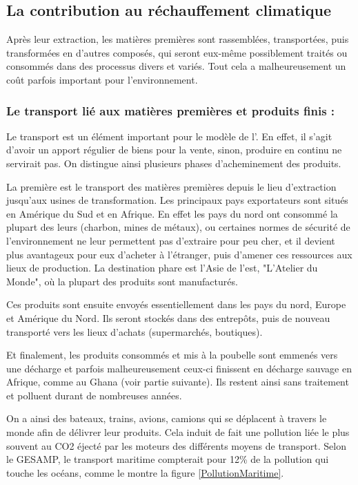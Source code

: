 \subsection{La contribution au réchauffement climatique}


Après leur extraction, les matières premières sont rassemblées, transportées, puis transformées en d'autres composés, qui seront eux-même possiblement traités ou consommés dans des processus divers et variés. Tout cela a malheureusement un coût parfois important pour l'environnement.


\subsubsection{Le transport lié aux matières premières et produits finis : }
Le transport est un élément important pour le modèle de l'\op. En effet, il s'agit d'avoir un apport régulier de biens pour la vente, sinon, produire en continu ne servirait pas. On distingue ainsi plusieurs phases d'acheminement des produits.

La première est le transport des matières premières depuis le lieu d'extraction jusqu'aux usines de transformation. Les principaux pays exportateurs sont situés en Amérique du Sud et en Afrique. En effet les pays du nord ont consommé la plupart des leurs (charbon, mines de métaux), ou certaines normes de sécurité de l'environnement ne leur permettent pas d'extraire pour peu cher, et il devient plus avantageux pour eux d'acheter à l'étranger, puis d'amener ces ressources aux lieux de production. La destination phare est l'Asie de l'est, "L'Atelier du Monde", où la plupart des produits sont manufacturés.

Ces produits sont ensuite envoyés essentiellement dans les pays du nord, Europe et Amérique du Nord. Ils seront stockés dans des entrepôts, puis de nouveau transporté vers les lieux d'achats (supermarchés, boutiques). 

Et finalement, les produits consommés et mis à la poubelle sont emmenés vers une décharge et parfois malheureusement ceux-ci finissent en décharge sauvage en Afrique, comme au Ghana (voir partie suivante). Ils restent ainsi sans traitement et polluent durant de nombreuses années.

On a ainsi des bateaux, trains, avions, camions qui se déplacent à travers le monde afin de délivrer leur produits. Cela induit de fait une pollution liée le plus souvent au CO2 éjecté par les moteurs des différents moyens de transport. Selon le GESAMP, le transport maritime compterait pour 12\% de la pollution qui touche les océans, comme le montre la figure \ref{PollutionMaritime}.

